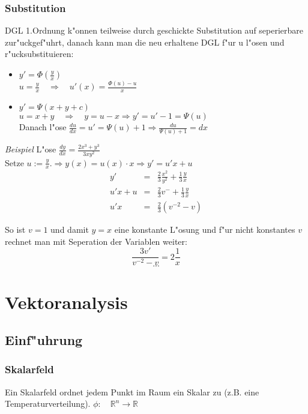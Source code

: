 \documentclass[10pt, a4paper, twocolumn]{scrartcl}
\begin{document}
\subsubsection{Substitution}

DGL 1.Ordnung k"onnen teilweise durch geschickte Substitution auf seperierbare zur"uckgef"uhrt, danach kann man die neu erhaltene DGL f"ur u l"osen und r"ucksubstituieren:

\begin{itemize}
 \item $y'=\Phi(\frac{y}{x})$\\
  $u=\frac{y}{x}\quad\Rightarrow\quad u'(x)=\frac{\Phi(u)-u}{x}$
 \item $y'=\Psi(x+y+c)$\\
  $u=x+y\quad\Rightarrow\quad y=u-x\Rightarrow y'=u'-1=\Psi(u)$\\
  Danach l"ose $\frac{du}{dx}=u'=\Psi(u)+1\Rightarrow \frac{du}{\Psi(u)+1}=dx$
\end{itemize}

\textit{Beispiel} L"ose $\frac{dy}{dx}=\frac{2x^3+y^3}{3xy^2}$\\
Setze $u:=\frac{y}{x}.\Rightarrow y(x)=u(x)\cdotp x\Rightarrow y'=u'x+u$
\begin{eqnarray}
 y'&	=&	\frac{2}{3}\frac{x^2}{y^2}+\frac{1}{3}\frac{y}{x}\nonumber\\
 u'x+u&	=&	\frac{2}{3}v^{-}+\frac{1}{3}\frac{y}{x}\nonumber\\
 u'x&	=&	\frac{2}{3}(v^{-2}-v)\nonumber
\end{eqnarray}

So ist $v=1$ und damit $y=x$ eine konstante L"osung und f"ur nicht konstantes $v$ rechnet man mit Seperation der Variablen weiter:
$$\frac{3v'}{v^{-2}-v}=2\frac{1}{x}$$
$$...$$

\section{Vektoranalysis}

\subsection{Einf"uhrung}

\subsubsection{Skalarfeld}
Ein Skalarfeld ordnet jedem Punkt im Raum ein Skalar zu (z.B. eine Temperaturverteilung). $\phi:\quad\mathbb{R}^n\rightarrow \mathbb{R}$
\end{document}
